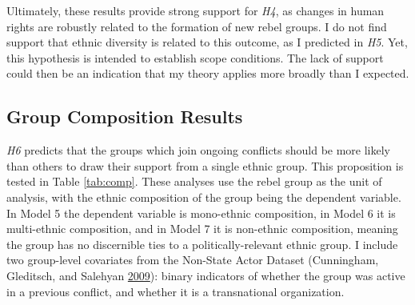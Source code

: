 \documentclass[12pt,]{book}
\theoremstyle{definition}
\theoremstyle{definition}
\theoremstyle{remark}
\begin{document}
Ultimately, these results provide strong support for \emph{H4}, as
changes in human rights are robustly related to the formation of new
rebel groups. I do not find support that ethnic diversity is related to
this outcome, as I predicted in \emph{H5}. Yet, this hypothesis is
intended to establish scope conditions. The lack of support could then
be an indication that my theory applies more broadly than I expected.

\subsection{Group Composition Results}\label{group-composition-results}

\emph{H6} predicts that the groups which join ongoing conflicts should
be more likely than others to draw their support from a single ethnic
group. This proposition is tested in Table \ref{tab:comp}. These
analyses use the rebel group as the unit of analysis, with the ethnic
composition of the group being the dependent variable. In Model 5 the
dependent variable is mono-ethnic composition, in Model 6 it is
multi-ethnic composition, and in Model 7 it is non-ethnic composition,
meaning the group has no discernible ties to a politically-relevant
ethnic group. I include two group-level covariates from the Non-State
Actor Dataset (Cunningham, Gleditsch, and Salehyan
\protect\hyperlink{ref-Cunningham2009}{2009}): binary indicators of
whether the group was active in a previous conflict, and whether it is a
transnational organization.
\end{document}
